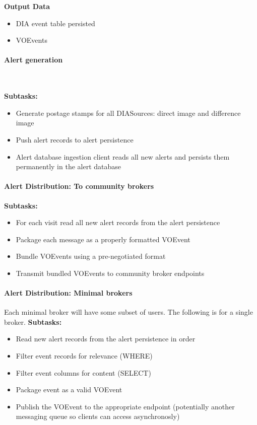{\bf Output Data}\\
\begin{itemize}
\item DIA event table persisted
\item VOEvents
\end{itemize}

\paragraph{Alert generation}~

\noindent
{\bf Subtasks:}
\begin{itemize}
\item Generate postage stamps for all DIASources: direct image and difference image
\item Push alert records to alert persistence
\item Alert database ingestion client reads all new alerts and persists them permanently in the alert database
\end{itemize}

\paragraph{Alert Distribution: To community brokers}
\noindent
{\bf Subtasks:}
\begin{itemize}
\item For each visit read all new alert records from the alert persistence
\item Package each message as a properly formatted VOEvent
\item Bundle VOEvents using a pre-negotiated format
\item Transmit bundled VOEvents to community broker endpoints
\end{itemize}

\paragraph{Alert Distribution: Minimal brokers}
\noindent
Each minimal broker will have some subset of users.  The following is for a single broker.
{\bf Subtasks:}
\begin{itemize}
\item Read new alert records from the alert persistence in order
\item Filter event records for relevance (WHERE)
\item Filter event columns for content (SELECT)
\item Package event as a valid VOEvent
\item Publish the VOEvent to the appropriate endpoint (potentially another messaging queue so clients can access asynchronosly)
\end{itemize}

